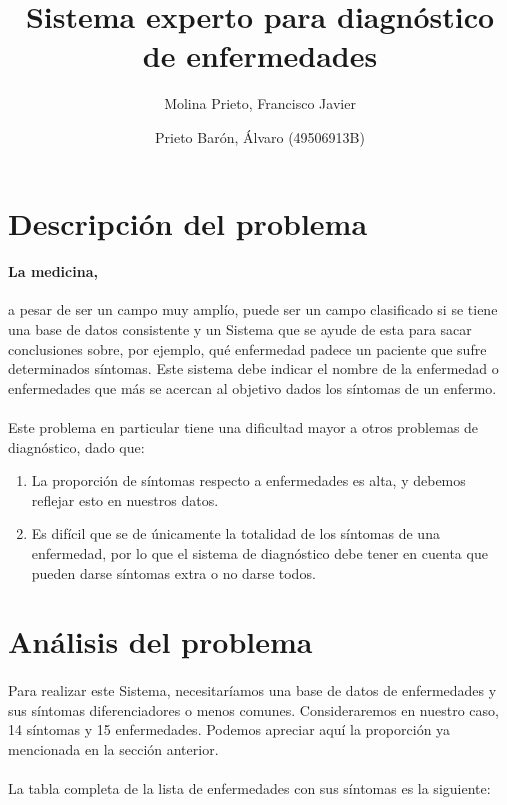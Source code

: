 \documentclass{article}
\title{Sistema experto para diagnóstico de enfermedades}
\author{Molina Prieto, Francisco Javier
        \and
        Prieto Barón, Álvaro (49506913B)}
\begin{document}
    \maketitle
    \pagebreak
    \tableofcontents
    \pagebreak

    \section{Descripción del problema}
    \paragraph{La medicina,}
    a pesar de ser un campo muy amplío, puede ser un campo clasificado si se tiene una base de datos consistente y un Sistema que se ayude de esta para sacar conclusiones sobre, por ejemplo, qué enfermedad padece un paciente que sufre determinados síntomas. Este sistema debe indicar el nombre de la enfermedad o enfermedades que más se acercan al objetivo dados los síntomas de un enfermo.
    \paragraph{}
    Este problema en particular tiene una dificultad mayor a otros problemas de diagnóstico, dado que:
    \begin{enumerate}
        \item La proporción de síntomas respecto a enfermedades es alta, y debemos reflejar esto en nuestros datos.
        \item Es difícil que se de únicamente la totalidad de los síntomas de una enfermedad, por lo que el sistema de diagnóstico debe tener en cuenta que pueden darse síntomas extra o no darse todos.
    \end{enumerate}
    \pagebreak
    \section{Análisis del problema}
    \paragraph{}
    Para realizar este Sistema, necesitaríamos una base de datos de enfermedades y sus síntomas diferenciadores o menos comunes. Consideraremos en nuestro caso, 14 síntomas y 15 enfermedades. Podemos apreciar aquí la proporción ya mencionada en la sección anterior.
    \paragraph{}
    La tabla completa de la lista de enfermedades con sus síntomas es la siguiente:
\end{document}

